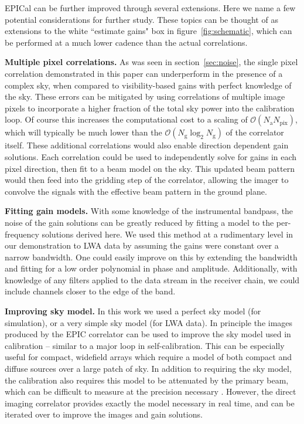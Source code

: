 \documentclass[a4paper,fleqn,usenatbib]{mnras}
\newcommand{\Nant}{\ensuremath{N_{\mathrm{a}}}}
\newcommand{\Ng}{\ensuremath{N_{\mathrm{g}}}}
\begin{document}
EPICal can be further improved through several extensions. Here we name a few potential 
considerations for further study. These topics can be thought of as extensions to the white 
``estimate gains" box in figure~\ref{fig:schematic}, which can be performed at a much lower 
cadence than the actual correlations.

\textbf{Multiple pixel correlations.} As was seen in section~\ref{sec:noise}, the single pixel 
correlation demonstrated in this paper can underperform in the presence of a complex sky, 
when compared to visibility-based gains with perfect knowledge of the sky. These errors can be 
mitigated by using correlations of multiple image pixels to incorporate a higher fraction of the 
total sky power into the calibration loop. Of course this increases the computational cost to a 
scaling of $\mathcal{O}(\Nant N_{\mathrm{pix}})$, which will typically be much lower than the 
$\mathcal{O}(\Ng \log_2 \Ng)$ of the correlator itself. These additional correlations would also 
enable direction dependent gain solutions. Each correlation could be used to independently 
solve for gains in each pixel direction, then fit to a beam model on the sky. This updated beam 
pattern would then feed into the gridding step of the correlator, allowing the imager to convolve 
the signals with the effective beam pattern in the ground plane. 

\textbf{Fitting gain models.} With some knowledge of the instrumental bandpass, the noise of 
the gain solutions can be greatly reduced by fitting a model to the per-frequency solutions 
derived here. We used this method at a rudimentary level in our demonstration to LWA data by 
assuming the gains were constant over a narrow bandwidth. One could easily improve on this 
by extending the bandwidth and fitting for a low order polynomial in phase and amplitude. 
Additionally, with knowledge of 
any filters applied to the data stream in the receiver chain,
we could include channels closer to the edge of the band.

\textbf{Improving sky model.} In this work we used a perfect sky model (for simulation), or a 
very simple sky model (for LWA data). In principle the images produced by the EPIC correlator 
can be used to improve the sky model used in calibration -- similar to a major loop in 
self-calibration. This can be especially useful for compact, widefield arrays which require a model of 
both compact and diffuse sources over a large patch of sky. In addition to requiring the sky 
model, the calibration also requires this model to be attenuated by the primary beam, which 
can be difficult to measure at the precision necessary \citep[e.g.][]{neb15,vir14,thy15b}. 
However, the direct imaging correlator provides exactly the model necessary in real time, and 
can be iterated over to improve the images and gain solutions.
\end{document}
